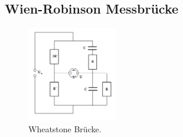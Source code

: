 \subsection{Wien-Robinson Messbrücke}
\begin{figure}[H]
    \centering
        \centering
        \includegraphics[width=0.35\textwidth]{Bilder/wien_robinson.png}
        \caption{Wheatstone Brücke. \cite{anleitung}}
    \hfill
    \label{fig:f5}
\end{figure}

